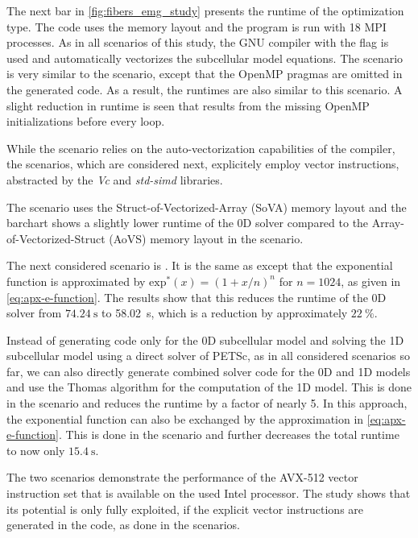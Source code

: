 The next bar in \cref{fig:fibers_emg_study} presents the runtime of the  optimization type. The code uses the  memory layout and the program is run with 18 MPI processes. As in all scenarios of this study, the GNU compiler with the  flag is used and automatically vectorizes the subcellular model equations. The  scenario is very similar to the  scenario, except that the OpenMP pragmas are omitted in the generated code. As a result, the runtimes are also similar to this scenario. A slight reduction in runtime is seen that results from the missing OpenMP initializations before every loop.

While the  scenario relies on the auto-vectorization capabilities of the compiler, the  scenarios, which are considered next, explicitely employ vector instructions, abstracted by the \emph{Vc} and \emph{std-simd} libraries. 

The  scenario uses the Struct-of-Vectorized-Array (SoVA) memory layout and the barchart shows a slightly lower runtime of the 0D solver compared to the Array-of-Vectorized-Struct (AoVS) memory layout in the  scenario.

The next considered scenario is . It is the same as  except that the exponential function is approximated by $\textrm{exp}^\ast(x)=(1+x/n)^n$ for $n=1024$, as given in \cref{eq:apx-e-function}. The results show that this reduces the runtime of the 0D solver from $\SI{74.24}{\s}$ to \SI{58.02}{\s}, which is a reduction by approximately $\SI{22}{\percent}$.

Instead of generating code only for the 0D subcellular model and solving the 1D subcellular model using a direct solver of PETSc, as in all considered scenarios so far, we can also directly generate combined solver code for the 0D and 1D models and use the Thomas algorithm for the computation of the 1D model. This is done in the  scenario and reduces the runtime by a factor of nearly 5. In this approach, the exponential function can also be exchanged by the approximation in \cref{eq:apx-e-function}. This is done in the  scenario and further decreases the total runtime to now only $\SI{15.4}{\s}$.

The two  scenarios demonstrate the performance of the AVX-512 vector instruction set that is available on the used Intel processor. The study shows that its potential is only fully exploited, if the explicit vector instructions are generated in the code, as done in the  scenarios.

